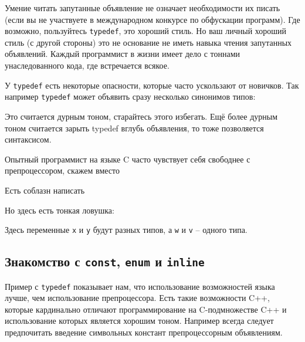 \documentclass[a4paper,12pt,oneside]{article}
\begin{document}


Умение читать запутанные объявление не означает необходимости их писать (если вы не участвуете в международном конкурсе по обфускации программ). Где возможно, пользуйтесь \lstinline!typedef!, это хороший стиль. Но ваш личный хороший стиль (с другой стороны) это не основание не иметь навыка чтения запутанных объявлений. Каждый программист в жизни имеет дело с тоннами унаследованного кода, где встречается всякое.

У \lstinline!typedef! есть некоторые опасности, которые часто ускользают от новичков. Так например \lstinline!typedef! может объявить сразу несколько синонимов типов:



Это считается дурным тоном, старайтесь этого избегать. Ещё более дурным тоном считается зарыть typedef вглубь объявления, то тоже позволяется синтаксисом.



Опытный программист на языке C часто чувствует себя свободнее с препроцессором, скажем вместо



Есть соблазн написать



Но здесь есть тонкая ловушка:



Здесь переменные \lstinline!x! и \lstinline!y! будут разных типов, а \lstinline!w! и \lstinline!v! – одного типа.

\subsection{Знакомство с \lstinline!const!, \lstinline!enum! и \lstinline!inline!}

Пример с \lstinline!typedef! показывает нам, что использование возможностей языка лучше, чем использование препроцессора. Есть такие возможности C++, которые кардинально отличают программирование на C-подмножестве C++ и использование которых является хорошим тоном. Например всегда следует предпочитать введение символьных констант препроцессорным объявлениям.


\end{document}
